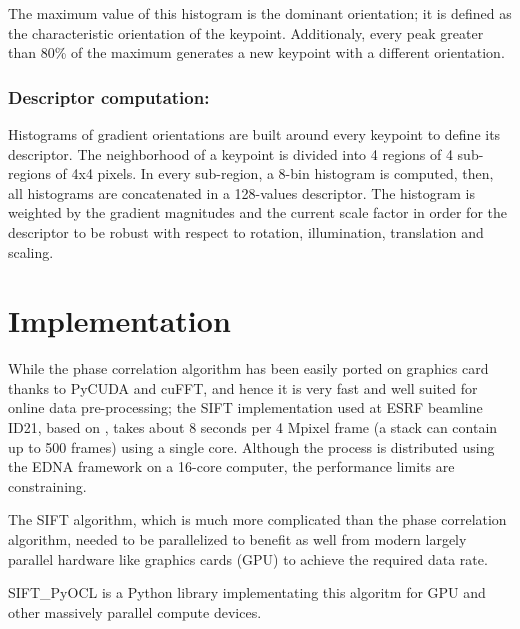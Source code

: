 \documentclass[preprint]{iucr}
\begin{document}
The maximum value of this histogram is the dominant orientation; it is defined
as the characteristic orientation of the keypoint.
Additionaly, every peak greater than 80\% of the maximum generates a new
keypoint with a different orientation.



\subsubsection{Descriptor computation:}
Histograms of gradient orientations are built around every keypoint to define
its descriptor.
The neighborhood of a keypoint is divided into 4 regions of 4 sub-regions of 4x4
pixels.
In every sub-region, a 8-bin histogram is computed, then, all histograms
are concatenated in a 128-values descriptor.
The histogram is weighted by the gradient magnitudes and the current scale
factor in order for the descriptor to be robust with respect to rotation,
illumination, translation and scaling.


\section{Implementation}

While the phase correlation algorithm has been easily ported on graphics card
thanks to PyCUDA \cite{pyopencl} and cuFFT, and hence it is very fast and well
suited for online data pre-processing;
the SIFT implementation used at ESRF beamline ID21, based on \cite{ASIFT}, 
takes about 8 seconds per 4 Mpixel frame  (a stack can contain up to  500 frames) using
a single core.
Although the process is distributed using the EDNA framework \cite{edna} on a
16-core computer, the performance limits are constraining.

The SIFT algorithm, which is much more complicated than the phase
correlation algorithm, needed to be parallelized to benefit as well from modern
largely parallel hardware like graphics cards (GPU) to achieve the required 
data rate.

SIFT\_PyOCL is a Python library implementating this algoritm for GPU
and other massively parallel compute devices.


\end{document}

